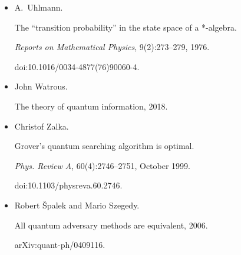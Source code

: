 \begin{itemize}
doi:10.1137/s0097539795293172.





\item[] 
[30]

A. Uhlmann.


The “transition probability” in the state space of a *-algebra.


\emph{Reports on Mathematical Physics}, 9(2):273–279, 1976.


doi:10.1016/0034-4877(76)90060-4.





\item[] 
[31]

John Watrous.


The theory of quantum information, 2018.





\item[] 
[32]

Christof Zalka.


Grover’s quantum searching algorithm is optimal.


\emph{Phys. Review A}, 60(4):2746–2751, October 1999.


doi:10.1103/physreva.60.2746.





\item[] 
[33]

Robert Špalek and Mario Szegedy.


All quantum adversary methods are equivalent, 2006.


arXiv:quant-ph/0409116.





\end{itemize}

